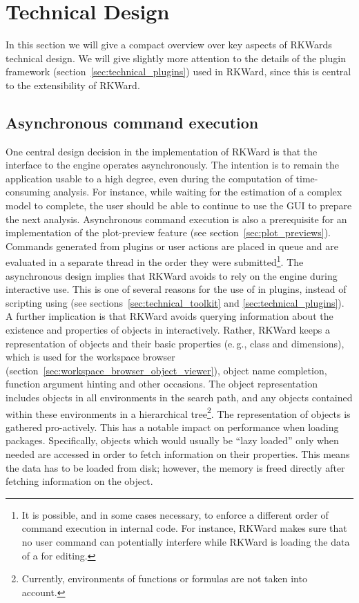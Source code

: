\section{Technical Design}
\label{sec:technical}
In this section we will give a compact overview over key aspects of RKWards
technical design. We will give slightly more attention to the details of the
plugin framework (section~\ref{sec:technical_plugins}) used in RKWard, since this is central to the extensibility of
RKWard.

\subsection{Asynchronous command execution}
\label{sec:technical_asynchronous}
One central design decision in the implementation of RKWard is that the
interface to the  engine operates asynchronously. The intention is to
remain the application usable to a high degree, even during the computation of
time-consuming analysis. For instance, while waiting for the estimation of a
complex model to complete, the user should be able to continue to use the GUI to
prepare the next analysis. Asynchronous command execution is also a prerequisite
for an implementation of the plot-preview feature (see section~\ref{sec:plot_previews}). Commands
generated from plugins or user actions are placed in queue and are evaluated in
a separate thread in the order they were submitted\footnote{
    It is possible, and in some cases necessary, to enforce a different order of command execution in
    internal code. For instance, RKWard makes sure that no user command can
    potentially interfere while RKWard is loading the data of a  for
    editing.
}. The asynchronous design implies that RKWard avoids to rely on the
 engine during interactive use. This is one of several reasons for
the use of  in plugins, instead of scripting using
 (see sections~\ref{sec:technical_toolkit} and \ref{sec:technical_plugins}).
A further implication is that RKWard avoids querying information about the
existence and properties of objects in  interactively. Rather,
RKWard keeps a representation of  objects and their basic properties
(e.\,g., class and dimensions), which is used for the workspace browser (section~\ref{sec:workspace_browser_object_viewer}),
object name completion, function argument hinting and
other occasions. The object representation includes objects in all environments
in the search path, and any objects contained within these environments in a
hierarchical tree\footnote{
    Currently, environments of functions or formulas are not taken into account.
}. The representation of  objects is gathered
pro-actively. This has a notable impact on performance when loading packages.
Specifically, objects which would usually be ``lazy loaded'' only when needed \citep[see][]{Ripley2004} are
accessed in order to fetch information on their properties. This means the data
has to be loaded from disk; however, the memory is freed directly after fetching
information on the object.

